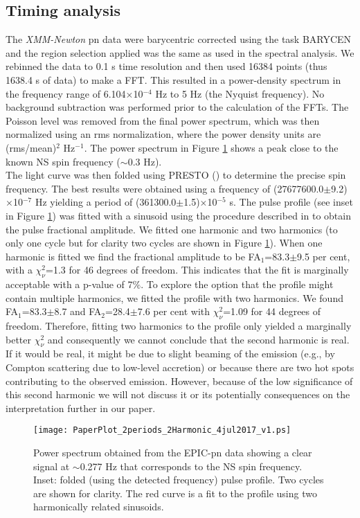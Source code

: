 \documentclass[a4paper,fleqn,usenatbib]{mnras}
\begin{document}
\subsection{Timing analysis}\label{subsec:timing}
The  \textit{XMM-Newton} pn data were barycentric corrected using the task BARYCEN and the region selection applied was the same as used in the spectral analysis. We rebinned the data to 0.1 s time resolution and then used 16384 points (thus 1638.4 s of data) to make a FFT. This resulted in a power-density spectrum in the frequency range of 6.104$\times$10$^{-4}$ Hz to 5 Hz (the Nyquist frequency). No background subtraction was performed prior to the calculation of the FFTs. The Poisson level was removed from the final power spectrum, which was then normalized using an rms normalization, where the power density units are (rms/mean)$^2$ Hz$^{-1}$. The power spectrum in Figure \ref{fig:Pulse} shows a peak close to the known NS spin frequency ($\sim$0.3 Hz).\\
\indent The light curve was then folded using PRESTO (\citealt{Ransom2001}) to determine the precise spin frequency. The best results were obtained using a frequency of (27677600.0$\pm$9.2)$\times$10$^{-7}$ Hz yielding a period of (361300.0$\pm$1.5)$\times$10$^{-5}$ s. The pulse profile (see inset in Figure \ref{fig:Pulse}) was fitted with a sinusoid using the procedure described in \cite{Patruno2010} to obtain the pulse fractional amplitude. We fitted one harmonic and two harmonics (to only one cycle but for clarity two cycles are shown in Figure \ref{fig:Pulse}). When one harmonic is fitted we find the fractional amplitude to be FA$_1$=83.3$\pm$9.5 per cent, with a $\chi^{2}_{\nu}$=1.3 for 46 degrees of freedom. This indicates that the fit is marginally acceptable with a p-value of 7$\%$. To explore the option that the profile might contain multiple harmonics, we fitted the profile with two harmonics. We found FA$_1$=83.3$\pm$8.7 and FA$_2$=28.4$\pm$7.6 per cent with $\chi^{2}_{\nu}$=1.09 for 44 degrees of freedom. Therefore, fitting two harmonics to the profile only yielded a marginally better $\chi^{2}_{\nu}$ and consequently we cannot conclude that the second harmonic is real. If it would be real, it might be due to slight beaming of the emission (e.g., by Compton scattering due to low-level accretion) or because there are two hot spots contributing to the observed emission. However, because of the low significance of this second harmonic we will not discuss it or its potentially consequences on the interpretation further in our paper.\\
\begin{figure}
\centering
\texttt{[image: PaperPlot\_2periods\_2Harmonic\_4jul2017\_v1.ps]}
    \caption{Power spectrum obtained from the EPIC-pn data showing a clear signal at $\sim$0.277 Hz that corresponds to the NS spin frequency. Inset: folded (using the detected frequency) pulse profile. Two cycles are shown for clarity. The red curve is a fit to the profile using two harmonically related sinusoids.}
   \label{fig:Pulse}
\end{figure}
\end{document}
